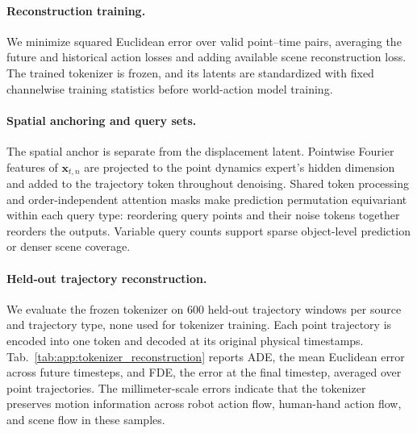 \paragraph{Reconstruction training.}
We minimize squared Euclidean error over valid point--time pairs,
averaging the future and historical action losses and adding available
scene reconstruction loss. The trained tokenizer is frozen, and its
latents are standardized with fixed channelwise training statistics
before world-action model training.

\paragraph{Spatial anchoring and query sets.}
The spatial anchor is separate from the displacement latent. Pointwise
Fourier features of $\mathbf x_{t,n}$ are projected to the point dynamics expert's
hidden dimension and added to the trajectory token throughout denoising.
Shared token processing and order-independent attention masks make
prediction permutation equivariant within each query type: reordering
query points and their noise tokens together reorders the outputs.
Variable query counts support sparse object-level prediction or denser
scene coverage.

\paragraph{Held-out trajectory reconstruction.}
We evaluate the frozen tokenizer on 600 held-out trajectory windows per
source and trajectory type, none used for tokenizer training. Each point
trajectory is encoded into one token and decoded at its original physical
timestamps. Tab.~\ref{tab:app:tokenizer_reconstruction} reports ADE,
the mean Euclidean error across future timesteps, and FDE, the error at
the final timestep, averaged over point trajectories. The millimeter-scale
errors indicate that the tokenizer preserves motion information across
robot action flow, human-hand action flow, and scene flow in these samples.

